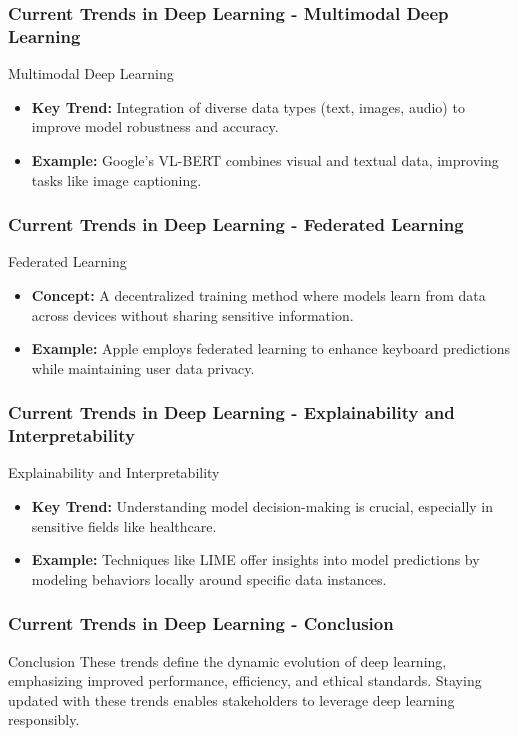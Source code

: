 \documentclass[aspectratio=169]{beamer}
\begin{document}
\begin{frame}[fragile]
    \frametitle{Current Trends in Deep Learning - Multimodal Deep Learning}
    \begin{block}{Multimodal Deep Learning}
        \begin{itemize}
            \item \textbf{Key Trend:} Integration of diverse data types (text, images, audio) to improve model robustness and accuracy.
            \item \textbf{Example:} Google’s VL-BERT combines visual and textual data, improving tasks like image captioning.
        \end{itemize}
    \end{block}
\end{frame}

\begin{frame}[fragile]
    \frametitle{Current Trends in Deep Learning - Federated Learning}
    \begin{block}{Federated Learning}
        \begin{itemize}
            \item \textbf{Concept:} A decentralized training method where models learn from data across devices without sharing sensitive information.
            \item \textbf{Example:} Apple employs federated learning to enhance keyboard predictions while maintaining user data privacy.
        \end{itemize}
    \end{block}
\end{frame}

\begin{frame}[fragile]
    \frametitle{Current Trends in Deep Learning - Explainability and Interpretability}
    \begin{block}{Explainability and Interpretability}
        \begin{itemize}
            \item \textbf{Key Trend:} Understanding model decision-making is crucial, especially in sensitive fields like healthcare.
            \item \textbf{Example:} Techniques like LIME offer insights into model predictions by modeling behaviors locally around specific data instances.
        \end{itemize}
    \end{block}
\end{frame}

\begin{frame}[fragile]
    \frametitle{Current Trends in Deep Learning - Conclusion}
    \begin{block}{Conclusion}
        These trends define the dynamic evolution of deep learning, emphasizing improved performance, efficiency, and ethical standards. Staying updated with these trends enables stakeholders to leverage deep learning responsibly.
    \end{block}
\end{frame}
\end{document}
